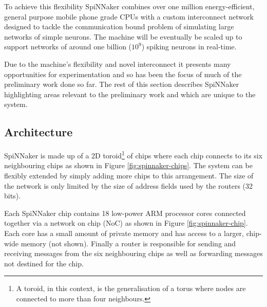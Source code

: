 		To achieve this flexibility SpiNNaker combines over one million
		energy-efficient, general purpose mobile phone grade CPUs with a custom
		interconnect network designed to tackle the communication bound problem of
		simulating large networks of simple neurons. The machine will be eventually
		be scaled up to support networks of around one billion ($10^9$) spiking
		neurons in real-time.
		
		Due to the machine's flexibility and novel interconnect it presents many
		opportunities for experimentation and so has been the focus of much of the
		preliminary work done so far. The rest of this section describes SpiNNaker
		highlighting areas relevant to the preliminary work and which are unique to
		the system.
		
		\subsection{Architecture}
			
			
			SpiNNaker is made up of a 2D toroid\footnote{A toroid, in this context, is
			the generalisation of a torus where nodes are connected to more than four
			neighbours.} of chips where each chip connects to its six neighbouring
			chips as shown in Figure \ref{fig:spinnaker-chips}. The system can be
			flexibly extended by simply adding more chips to this arrangement. The
			size of the network is only limited by the size of address fields used by
			the routers (32 bits).
			
			Each SpiNNaker chip contains 18 low-power ARM processor cores connected
			together via a network on chip (NoC) as shown in Figure
			\ref{fig:spinnaker-chip}. Each core has a small amount of private memory
			and has access to a larger, chip-wide memory (not shown). Finally a router
			is responsible for sending and receiving messages from the six
			neighbouring chips as well as forwarding messages not destined for the
			chip.
			
			
